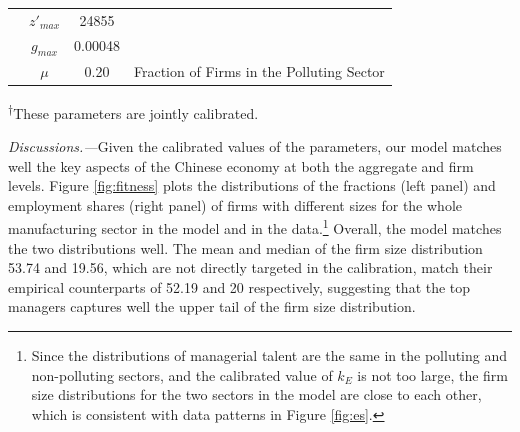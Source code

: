 \documentclass[AEJ]{AEA}
\begin{document}
\begin{table}[t]
\begin{tabular}{lccl}
                  & $z'_{max}$        & 24855         &                                                             \\
                  & $g_{max}$         & 0.00048       &                                                             \\
                  & $\mu$             & 0.20          & Fraction of Firms in the Polluting Sector                   \\
    \hline
\end{tabular}
\begin{tablenotes}
     \textsuperscript{$\dagger$}These parameters are jointly calibrated.
\end{tablenotes}
\label{tab:calibration}
\end{table}

\textit{Discussions.---}Given the calibrated values of the parameters, our model matches well the key aspects of the Chinese economy at both the aggregate and firm levels. Figure \ref{fig:fitness} plots the distributions of the fractions (left panel) and employment shares (right panel) of firms with different sizes for the whole manufacturing sector in the model and in the data.\footnote{Since the distributions of managerial talent are the same in the polluting and non-polluting sectors, and the calibrated value of  $k_E$ is not too large, the firm size distributions for the two sectors in the model are close to each other, which is consistent with data patterns in Figure \ref{fig:es}.} Overall, the model matches the two distributions well. The mean and median of the firm size distribution 53.74 and 19.56, which are not directly targeted in the calibration, match their empirical counterparts of 52.19 and 20 respectively, suggesting that the top managers captures well the upper tail of the firm size distribution.
\end{document}
